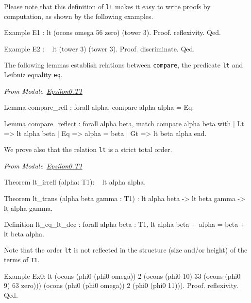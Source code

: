 \label{Predicates:lt-T1}
Please note that this definition of \texttt{lt} makes it easy to write proofs by computation, as shown by the following examples.

\begin{Coqsrc}
Example E1 : lt (ocons omega 56 zero) (tower 3).
Proof. reflexivity. Qed.

Example E2 : ~ lt (tower 3) (tower 3).
Proof.  discriminate.  Qed.
\end{Coqsrc}

The following lemmas establish relations between \texttt{compare}, 
the predicate \texttt{lt} and Leibniz equality \texttt{eq}.

\vspace{4pt}
\emph{From Module~\href{../theories/html/hydras.Epsilon0.T1.html\#compare_refl}{Epsilon0.T1}}


\begin{Coqsrc}
Lemma compare_refl : forall alpha, compare alpha alpha =  Eq.
\end{Coqsrc}

\begin{Coqsrc}
Lemma compare_reflect : forall alpha beta,
    match compare alpha beta with
    |   Lt => lt alpha  beta
    |   Eq => alpha = beta
    |   Gt => lt beta  alpha
    end.
\end{Coqsrc}

We prove also that the relation \texttt{lt} is a strict total order.

\vspace{4pt}
\emph{From Module~\href{../theories/html/hydras.Epsilon0.T1.html\#lt_irrefl}{Epsilon0.T1}}

  
\begin{Coqsrc}
Theorem lt_irrefl (alpha: T1):  ~ lt alpha alpha.

Theorem lt_trans (alpha beta gamma : T1) :
  lt alpha  beta -> lt beta gamma -> lt alpha gamma.

Definition lt_eq_lt_dec  :
   forall alpha beta : T1, 
          {lt alpha  beta} + {alpha = beta} + {lt beta alpha}.
\end{Coqsrc}


Note that the order \texttt{lt} is not reflected 
in the structure (size and/or height) of the terms of \texttt{T1}. 

\begin{Coqsrc}
Example Ex0:
  lt (ocons (phi0 (phi0 omega)) 2
            (ocons (phi0 10) 33
                   (ocons (phi0 9) 63 zero)))
     (ocons  (phi0 (phi0 omega)) 2 (phi0 (phi0 11))).
Proof.
  reflexivity. 
Qed.
\end{Coqsrc}

